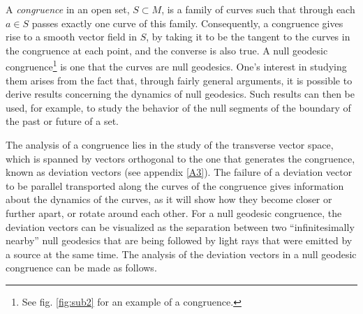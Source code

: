 \documentclass[
12pt,		%
openright,	%
twoside,  %
a4paper,			%
chapter=TITLE,		%
english,			%
french,				%
spanish,			%
brazil				%
]{USPSC-classe/USPSC}
\begin{document}
A \textit{congruence} in an open set, $S\subset M$, is a family of curves such that through each $a\in S$ passes exactly one curve of this family. Consequently, a congruence gives rise to a smooth vector field in $S$, by taking it to be the tangent to the curves in the congruence at each point, and the converse is also true. A null geodesic congruence\footnote{See fig. \ref{fig:sub2} for an example of a congruence.} is one that the curves are null geodesics. One's interest in studying them arises from the fact that, through fairly general arguments, it is possible to derive results concerning the dynamics of null geodesics. Such results can then be used, for example, to study the behavior of the null segments of the boundary of the past or future of a set. 

The analysis of a congruence lies in the study of the transverse vector space, which is spanned by vectors orthogonal to the one that generates the congruence, known as deviation vectors (see appendix \ref{A3}). The failure of a deviation vector to be parallel transported along the curves of the congruence gives information about the dynamics of the curves, as it will show how they become closer or further apart, or rotate around each other. For a null geodesic congruence, the deviation vectors can be visualized as the separation between two “infinitesimally nearby” null geodesics that are being followed by light rays that were emitted by a source at the same time. The analysis of the deviation vectors in a null geodesic congruence can be made as follows.
\end{document}
